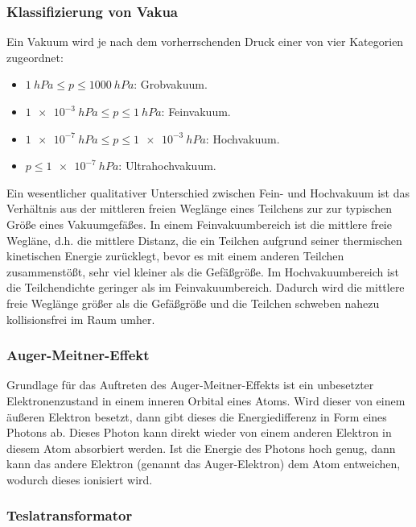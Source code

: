 \documentclass{article}
\begin{document}
\cite[268]{demtröder}


\subsubsection{Klassifizierung von Vakua}

Ein Vakuum wird je nach dem vorherrschenden Druck einer von vier Kategorien
zugeordnet:
\begin{itemize}
    \item $\qty{1}{hPa} \leq p \leq \qty{1000}{hPa}$: Grobvakuum.
    \item $\qty{1e-3}{hPa} \leq p \leq \qty{1}{hPa}$: Feinvakuum.
    \item $\qty{1e-7}{hPa} \leq p \leq \qty{1e-3}{hPa}$: Hochvakuum.
    \item $p \leq \qty{1e-7}{hPa}$: Ultrahochvakuum.
\end{itemize}
Ein wesentlicher qualitativer Unterschied zwischen Fein- und Hochvakuum ist das
Verhältnis aus der mittleren freien Weglänge eines Teilchens zur
zur typischen Größe eines Vakuumgefäßes. In einem Feinvakuumbereich ist die mittlere
freie Wegläne, d.h. die mittlere Distanz, die ein Teilchen aufgrund seiner
thermischen kinetischen Energie zurücklegt, bevor es mit einem anderen Teilchen
zusammenstößt, sehr viel kleiner als die Gefäßgröße.
Im Hochvakuumbereich ist die Teilchendichte geringer als im Feinvakuumbereich.
Dadurch wird die mittlere freie Weglänge größer als die Gefäßgröße und die Teilchen
schweben nahezu kollisionsfrei im Raum umher.

\cite[268--269]{demtröder}


\subsubsection{Auger-Meitner-Effekt}

Grundlage für das Auftreten des Auger-Meitner-Effekts ist ein unbesetzter
Elektronenzustand in einem inneren Orbital eines Atoms.
Wird dieser von einem äußeren Elektron besetzt, dann gibt dieses die Energiedifferenz
in Form eines Photons ab. Dieses Photon kann direkt wieder von einem anderen
Elektron in diesem Atom absorbiert werden. Ist die Energie des Photons hoch
genug, dann kann das andere Elektron (genannt das Auger-Elektron) dem Atom
entweichen, wodurch dieses ionisiert wird.

\cite{Ossila}


\subsubsection{Teslatransformator}
\end{document}
